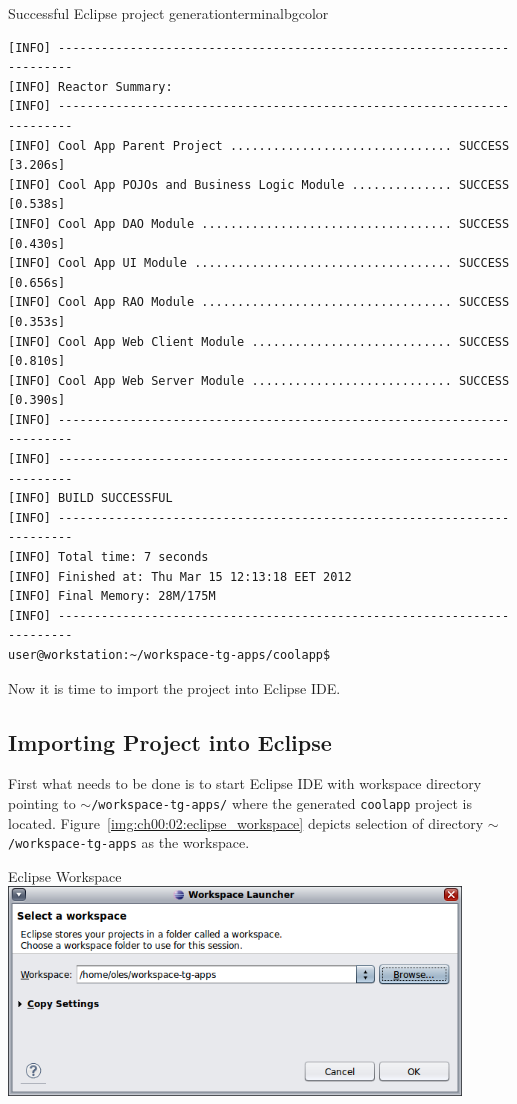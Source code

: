   \begin{code}{Successful Eclipse project generation}{\label{lst:mvn_eclipse_eclipse_completed}}{terminalbgcolor}
      \begin{lstlisting}
[INFO] ------------------------------------------------------------------------
[INFO] Reactor Summary:
[INFO] ------------------------------------------------------------------------
[INFO] Cool App Parent Project ............................... SUCCESS [3.206s]
[INFO] Cool App POJOs and Business Logic Module .............. SUCCESS [0.538s]
[INFO] Cool App DAO Module ................................... SUCCESS [0.430s]
[INFO] Cool App UI Module .................................... SUCCESS [0.656s]
[INFO] Cool App RAO Module ................................... SUCCESS [0.353s]
[INFO] Cool App Web Client Module ............................ SUCCESS [0.810s]
[INFO] Cool App Web Server Module ............................ SUCCESS [0.390s]
[INFO] ------------------------------------------------------------------------
[INFO] ------------------------------------------------------------------------
[INFO] BUILD SUCCESSFUL
[INFO] ------------------------------------------------------------------------
[INFO] Total time: 7 seconds
[INFO] Finished at: Thu Mar 15 12:13:18 EET 2012
[INFO] Final Memory: 28M/175M
[INFO] ------------------------------------------------------------------------
user@workstation:~/workspace-tg-apps/coolapp$ 
      \end{lstlisting}
  \end{code}

  Now it is time to import the project into Eclipse IDE.

\subsection{Importing Project into Eclipse}

  First what needs to be done is to start Eclipse IDE with workspace directory pointing to \texttt{$\sim$/workspace-tg-apps/} where the generated \texttt{coolapp} project is located.
  Figure~\ref{img:ch00:02:eclipse_workspace} depicts selection of directory \texttt{$\sim$/workspace-tg-apps} as the workspace.  

  \begin{image}{Eclipse Workspace}{\label{img:ch00:02:eclipse_workspace}}    
    \includegraphics[width=0.9\textwidth]{parts/00-part/chapters/01-application-modules/images/07-eclipse-workspace.png}
  \end{image}

